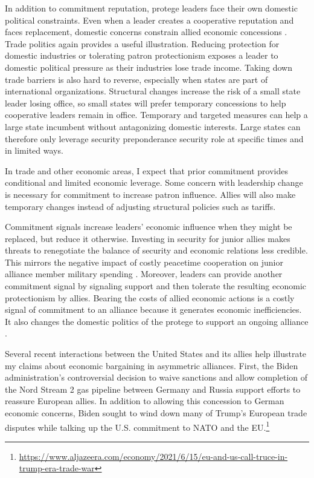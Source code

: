 \documentclass[12pt]{article}
\begin{document}
In addition to commitment reputation, protege leaders face their own domestic political constraints. 
Even when a leader creates a cooperative reputation and faces replacement, domestic concerns constrain allied economic concessions \citep{Davis2008}. 
Trade politics again provides a useful illustration.
Reducing protection for domestic industries or tolerating patron protectionism exposes a leader to domestic political pressure as their industries lose trade income.
Taking down trade barriers is also hard to reverse, especially when states are part of international organizations.
Structural changes increase the risk of a small state leader losing office, so small states will prefer temporary concessions to help cooperative leaders remain in office.
Temporary and targeted measures can help a large state incumbent without antagonizing domestic interests. 
Large states can therefore only leverage security preponderance security role at specific times and in limited ways.


In trade and other economic areas, I expect that prior commitment provides conditional and limited economic leverage. 
Some concern with leadership change is necessary for commitment to increase patron influence. 
Allies will also make temporary changes instead of adjusting structural policies such as tariffs. 


Commitment signals increase leaders' economic influence when they might be replaced, but reduce it otherwise. 
Investing in security for junior allies makes threats to renegotiate the balance of security and economic relations less credible. 
This mirrors the negative impact of costly peacetime cooperation on junior alliance member military spending \citep{Alley2021isq}.
Moreover, leaders can provide another commitment signal by signaling support and then tolerate the resulting economic protectionism by allies. 
Bearing the costs of allied economic actions is a costly signal of commitment to an alliance because it generates economic inefficiencies. 
It also changes the domestic politics of the protege to support an ongoing alliance \citep{Lake2013}. 


Several recent interactions between the United States and its allies help illustrate my claims about economic bargaining in asymmetric alliances. 
First, the Biden administration's controversial decision to waive sanctions and allow completion of the Nord Stream 2 gas pipeline between Germany and Russia support efforts to reassure European allies. 
In addition to allowing this concession to German economic concerns, Biden sought to wind down many of Trump's European trade disputes while talking up the U.S. commitment to NATO and the EU.\footnote{\url{https://www.aljazeera.com/economy/2021/6/15/eu-and-us-call-truce-in-trump-era-trade-war}}
\end{document}
